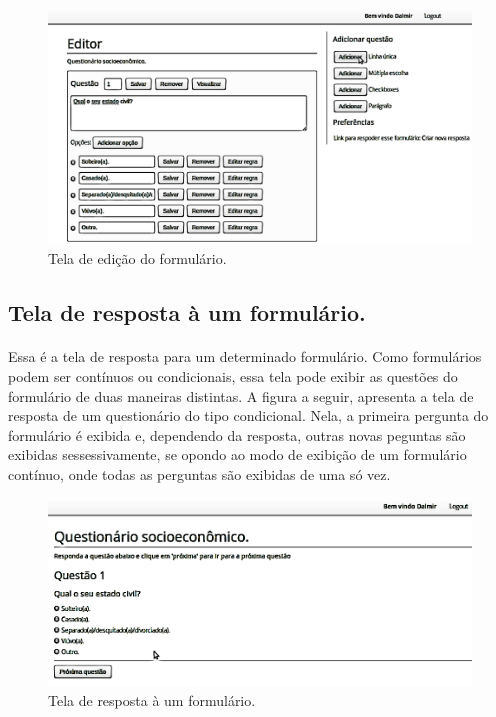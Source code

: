 \documentclass[11pt]{article}
\begin{document}
    \begin{figure}[h!]
      \centering
      \includegraphics[width=.9\textwidth]{editor.png}
      \caption{Tela de edição do formulário.}
    \end{figure}
        
  \clearpage
    
    \subsection{Tela de resposta à um formulário.}
    
    \paragraph{}
    Essa é a tela de resposta para um determinado formulário. Como formulários
    podem ser contínuos ou condicionais, essa tela pode exibir as questões 
    do formulário de duas maneiras distintas. A figura a seguir, apresenta
    a tela de resposta de um questionário do tipo condicional. Nela, 
    a primeira pergunta do formulário é exibida e, dependendo da resposta, 
    outras novas peguntas são exibidas sessessivamente, se opondo ao modo de exibição de um 
    formulário contínuo, onde todas as perguntas são exibidas de uma só vez.
        
    \begin{figure}[h!]
      \centering
      \includegraphics[width=.9\textwidth]{reply_a_form.png}
      \caption{Tela de resposta à um formulário.}
    \end{figure}
    
\end{document}
